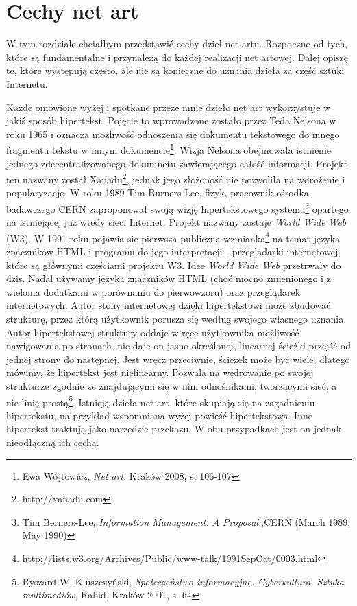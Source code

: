 \documentclass[a4paper,12pt,twoside]{article}
\begin{document}
\section{Cechy net art}
W tym rozdziale chciałbym przedstawić cechy dzieł net artu.
Rozpocznę od tych, które są fundamentalne i przynależą do każdej
realizacji net artowej. Dalej opiszę te, które występują często,
ale nie są konieczne do uznania dzieła za część sztuki Internetu.

Każde omówione wyżej i spotkane przeze mnie dzieło net art wykorzystuje
w jakiś sposób hipertekst. Pojęcie to wprowadzone zostało przez Teda
Nelsona w roku 1965 i oznacza możliwość odnoszenia się dokumentu
tekstowego do innego fragmentu tekstu w innym
dokumencie\footnote{ Ewa Wójtowicz, \textit{Net art}, Kraków 2008,
s. 106-107}. Wizja Nelsona obejmowała istnienie jednego zdecentralizowanego
dokumnetu zawierającego całość informacji. Projekt ten nazwany został
Xanadu\footnote{http://xanadu.com}, jednak jego złożoność nie pozwoliła
na wdrożenie i popularyzację.
W roku 1989 Tim Burners-Lee, fizyk, pracownik ośrodka badawczego CERN
zaproponował swoją wizję hipertekstowego systemu\footnote{Tim Berners-Lee,
\textit{Information Management: A Proposal.},CERN (March 1989, May 1990)}
opartego na istniejącej już wtedy sieci Internet. Projekt nazwany
zostaje \textit{World Wide Web} (W3). W 1991 roku pojawia się pierwsza
publiczna
wzmianka\footnote{http://lists.w3.org/Archives/Public/www-talk/1991SepOct/0003.html}
na temat języka znaczników HTML i programu do jego interpretacji - przegladarki
internetowej, które są głównymi częściami projektu W3.
Idee \textit{World Wide Web} przetrwały do dziś. Nadal używamy języka
znaczników HTML (choć mocno zmienionego i z wieloma dodatkami w porównaniu
do pierwowzoru) oraz przeglądarek internetowych. Autor stony internetowej
dzięki hipertekstowi może zbudować strukturę, przez którą użytkownik
porusza się według swojego własnego uznania. Autor hipertekstowej struktury
oddaje w ręce użytkownika możliwość nawigowania po stronach, nie daje on
jasno określonej, linearnej ścieżki przejść od jednej strony do następnej.
Jest wręcz przeciwnie, ścieżek może być wiele, dlatego mówimy, że hipertekst
jest nielinearny. Pozwala na wędrowanie po swojej strukturze zgodnie
ze znajdującymi się w nim odnośnikami, tworzącymi sieć, a nie linię
prostą\footnote{Ryszard W. Kluszczyński, \textit{Społeczeństwo informacyjne.
Cyberkultura. Sztuka multimediów}, Rabid, Kraków 2001, s. 64}. Istnieją
dzieła net art, które skupiają się na zagadnieniu
hipertekstu, na przykład wspomniana wyżej powieść hipertekstowa.
Inne hipertekst traktują jako narzędzie przekazu. W obu przypadkach
jest on jednak nieodłączną ich cechą.
\end{document}
